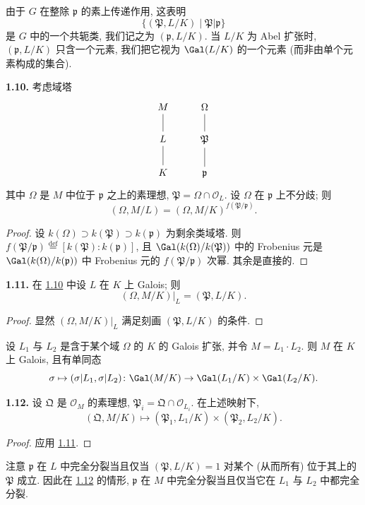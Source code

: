 由于 $G$ 在整除 $\mathfrak{p}$ 的素上传递作用, 这表明
\[
\{(\mathfrak{P},L/K)\mid\mathfrak{P}|\mathfrak{p}\}
\]
是 $G$ 中的一个共轭类, 我们记之为 $(\mathfrak{p},L/K)$. 当 $L/K$ 为 Abel 扩张时, $(\mathfrak{p},L/K)$ 只含一个元素, 我们把它视为 $\Gal(L/K)$ 的一个元素 (而非由单个元素构成的集合).

\hypertarget{item:v.1.10}{}\textbf{1.10.} 考虑域塔
\[
\begin{tikzcd}
M \ar[d, no head] & \Omega \ar[d, no head] \\
L \ar[d, no head] & \mathfrak{P} \ar[d, no head] \\
K & \mathfrak{p}
\end{tikzcd}
\]
其中 $\Omega$ 是 $M$ 中位于 $\mathfrak{p}$ 之上的素理想, $\mathfrak{P}=\Omega\cap\mathcal{O}_L$. 设 $\Omega$ 在 $\mathfrak{p}$ 上不分歧; 则
\[
(\Omega,M/L)=(\Omega,M/K)^{f(\mathfrak{P}/\mathfrak{p})}.
\]

\begin{proof}
设 $k(\Omega)\supset k(\mathfrak{P})\supset k(\mathfrak{p})$ 为剩余类域塔. 则 $f(\mathfrak{P}/\mathfrak{p})\overset{\mathrm{def}}{=}[k(\mathfrak{P}):k(\mathfrak{p})]$, 且 $\Gal(k(\Omega)/k(\mathfrak{P}))$ 中的 Frobenius 元是 $\Gal(k(\Omega)/k(\mathfrak{p}))$ 中 Frobenius 元的 $f(\mathfrak{P}/\mathfrak{p})$ 次幂. 其余是直接的.
\end{proof}

\hypertarget{item:v.1.11}{}\textbf{1.11.} 在 \hyperlink{item:v.1.10}{1.10} 中设 $L$ 在 $K$ 上 Galois; 则
\[
(\Omega,M/K)\big|_L=(\mathfrak{P},L/K).
\]

\begin{proof}
显然 $(\Omega,M/K)|_L$ 满足刻画 $(\mathfrak{P},L/K)$ 的条件.
\end{proof}

设 $L_1$ 与 $L_2$ 是含于某个域 $\Omega$ 的 $K$ 的 Galois 扩张, 并令 $M=L_1\cdot L_2$. 则 $M$ 在 $K$ 上 Galois, 且有单同态
\[
\sigma\mapsto(\sigma|L_1,\sigma|L_2)\colon\Gal(M/K)\to\Gal(L_1/K)\times\Gal(L_2/K).
\]

\hypertarget{item:v.1.12}{}\textbf{1.12.} 设 $\mathfrak{Q}$ 是 $\mathcal{O}_M$ 的素理想, $\mathfrak{P}_i=\mathfrak{Q}\cap\mathcal{O}_{L_i}$. 在上述映射下,
\[
(\mathfrak{Q},M/K)\mapsto(\mathfrak{P}_1,L_1/K)\times(\mathfrak{P}_2,L_2/K).
\]

\begin{proof}
应用 \hyperlink{item:v.1.11}{1.11}.
\end{proof}

注意 $\mathfrak{p}$ 在 $L$ 中完全分裂当且仅当 $(\mathfrak{P},L/K)=1$ 对某个 (从而所有) 位于其上的 $\mathfrak{P}$ 成立. 因此在 \hyperlink{item:v.1.12}{1.12} 的情形, $\mathfrak{p}$ 在 $M$ 中完全分裂当且仅当它在 $L_1$ 与 $L_2$ 中都完全分裂.

